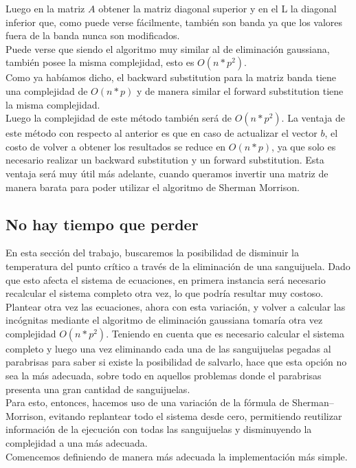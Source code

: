 Luego en la matriz $A$ obtener la matriz diagonal superior y en el L la diagonal inferior que, como puede verse fácilmente, también son banda ya que los valores fuera de la banda nunca son modificados.
\\
Puede verse que siendo el algoritmo muy similar al de eliminación gaussiana, también posee la misma complejidad, esto es $O(n*p^2)$.
\\
Como ya habíamos dicho, el backward substitution para la matriz banda tiene una complejidad de $O(n*p)$ y de manera similar el forward substitution tiene la misma complejidad.
\\
Luego la complejidad de este método también será de $O(n*p^2)$. La ventaja de este método con respecto al anterior es que en caso de actualizar el vector $b$, el costo de volver a obtener los resultados se reduce en $O(n*p)$, ya que solo es necesario realizar un backward substitution y un forward substitution. Esta ventaja será muy útil más adelante, cuando queramos invertir una matriz de manera barata para poder utilizar el algoritmo de Sherman Morrison.

\subsection{No hay tiempo que perder}

En esta sección del trabajo, buscaremos la posibilidad de disminuir la temperatura del punto crítico a través de la eliminación de una sanguijuela. Dado que esto afecta el sistema de ecuaciones, en primera instancia será necesario recalcular el sistema completo otra vez, lo que podría resultar muy costoso.
\\
Plantear otra vez las ecuaciones, ahora con esta variación, y volver a calcular las incógnitas mediante el algoritmo de eliminación gaussiana tomaría otra vez complejidad $O(n*p^2)$. Teniendo en cuenta que es necesario calcular el sistema completo y luego una vez eliminando cada una de las sanguijuelas pegadas al parabrisas para saber si existe la posibilidad de salvarlo, hace que esta opción no sea la más adecuada, sobre todo en aquellos problemas donde el parabrisas presenta una gran cantidad de sanguijuelas.
\\
Para esto, entonces, hacemos uso de una variación de la fórmula de Sherman–Morrison, evitando replantear todo el sistema desde cero, permitiendo reutilizar información de la ejecución con todas las sanguijuelas y disminuyendo la complejidad a una más adecuada.
\\
Comencemos definiendo de manera más adecuada la implementación más simple.

